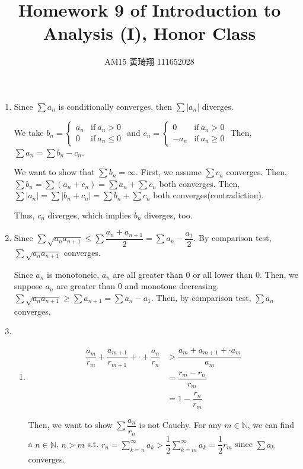 \documentclass[12pt]{article}
\title{Homework 9 of Introduction to Analysis (I), Honor Class}
\author{AM15 黃琦翔 111652028}
\begin{document}
\maketitle
\begin{enumerate}
    \item Since $\sum a_n$ is conditionally converges, then $\sum |a_n|$ diverges.
    
    We take $b_n = \left\lbrace\begin{matrix}
        a_n & \text{if}\ a_n > 0\\
        0 & \text{if}\ a_n \leq 0
    \end{matrix}\right.$ 
    and $c_n = \left\lbrace\begin{matrix}
        0 & \text{if}\ a_n > 0\\
        - a_n & \text{if}\ a_n \geq 0
    \end{matrix}\right.$
    Then, $\sum a_n = \sum b_n - c_n$.

    We want to show that $\sum b_n = \infty$. First, we assume $\sum c_n$ converges.
    Then, $\sum b_n = \sum (a_n + c_n) = \sum a_n + \sum c_n$ both converges.
    Then, $\sum |a_n| = \sum |b_n + c_n| = \sum b_n + \sum c_n$ both converges(contradiction).

    Thus, $c_n$ diverges, which implies $b_n$ diverges, too.

    \item Since $\sum \sqrt{a_n a_{n+1}} \leq \sum \dfrac{a_n + a_{n+1}}{2} = \sum a_n - \dfrac{a_1}{2}$.
    By comparison test, $\sum \sqrt{a_n a_{n+1}}$ converges.

    Since $a_n$ is monotoneic, $a_n$ are all greater than $0$ or all lower than $0$.
    Then, we suppose $a_n$ are greater than $0$ and monotone decreasing.
    $\sum \sqrt{a_n a_{n+1}} \geq \sum a_{n+1} = \sum a_n - a_1$.
    Then, by comparison test, $\sum a_n$ converges.

    \item \begin{enumerate}
        \item \begin{align*}
            \dfrac{a_m}{r_m} + \dfrac{a_{m+1}}{r_{m+1}} + \cdot + \dfrac{a_n}{r_n} &> \dfrac{a_m + a_{m+1} + \cdot a_m}{a_m}\\
            &= \dfrac{r_m - r_n}{r_m}\\
            &= 1 - \dfrac{r_n}{r_m}
        \end{align*}

        \newpage
        Then, we want to show $\sum \dfrac{a_n}{r_n}$ is not Cauchy.
        For any $m \in \mathbb{N}$, we can find a $n \in \mathbb{N}$, $n > m$ s.t. 
        $r_n = \displaystyle\sum_{k=n}^{\infty} a_k > \dfrac{1}{2} \displaystyle\sum_{k=m}^{\infty} a_k = \dfrac{1}{2}r_m$
        since $\displaystyle\sum a_k$ converges.


\end{enumerate}
\end{enumerate}
\end{document}
